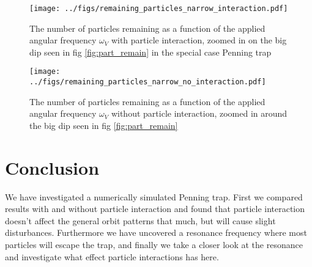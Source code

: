 \documentclass[english,notitlepage,reprint,nofootinbib]{revtex4-1}  %
\begin{document}
\begin{figure}[h!]
	\centering
	\texttt{[image: ../figs/remaining\_particles\_narrow\_interaction.pdf]} %
	\caption{The number of particles remaining as a function of the applied angular frequency $\omega_V$ with particle interaction, zoomed in on the big dip seen in fig \ref{fig:part_remain} in the special case Penning trap}
	\label{fig:narrow_i}
\end{figure}

\begin{figure}[h!]
	\centering
	\texttt{[image: ../figs/remaining\_particles\_narrow\_no\_interaction.pdf]} %
	\caption{The number of particles remaining as a function of the applied angular frequency $\omega_V$ without particle interaction, zoomed in around the big dip seen in fig \ref {fig:part_remain}}
	\label{fig:narrow_ni}
\end{figure}
	
	
	\section{Conclusion}\label{sec:conclusion}
	We have investigated a numerically simulated Penning trap. First we compared results with and without particle interaction and found that particle interaction doesn't affect the general orbit patterns that much, but will cause slight disturbances. Furthermore we have uncovered a resonance frequency where most particles will escape the trap, and finally we take a closer look at the resonance and investigate what effect particle interactions has here. 
	
	\onecolumngrid
	
	
	
	
\end{document}
